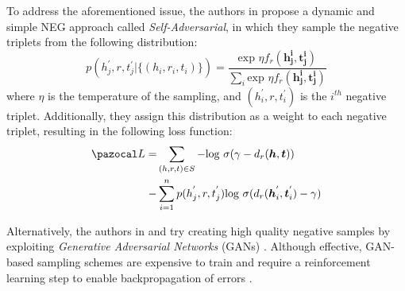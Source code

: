 To address the aforementioned issue, the authors in \cite{sun2019rotate} propose a dynamic and simple NEG approach called \emph{Self-Adversarial}, in which they sample the negative triplets from the following distribution: 
\begin{equation}
\label{eq:dist_adv}
    p(h_j^{'},r,t_j^{'}|\{(h_i,r_i,t_i)\})=\frac{\text{exp }\eta f_r(\boldsymbol{h_j^{i}},\boldsymbol{t_j^{i}})}{\sum_{i}\text{exp }\eta f_r(\boldsymbol{h_j^{i}},\boldsymbol{t_j^{i}})}
\end{equation}
where $\eta$ is the temperature of the sampling, and $(h_i^{'},r,t_i^{'})$ is the $i^{th}$ negative triplet. Additionally, they assign this distribution as a weight to each negative triplet, resulting in the following loss function: 
\begin{align}
    \Lb = &\sum_{(h,r,t) \in S} -\text{log }\sigma(\gamma - d_r(\boldsymbol{h},\boldsymbol{t}))  \notag \\ 
    - &\sum_{i=1}^{n}p(h_j^{'},r,t_j^{'})\text{log }\sigma(d_r(\boldsymbol{h}_i^{'},\boldsymbol{t}_i^{'})-\gamma)
\end{align}


Alternatively, the authors in \cite{wang2018incorporating} and \cite{cai2017kbgan} try creating high quality negative samples by exploiting \emph{Generative Adversarial Networks} (GANs) \cite{goodfellow2014generative}. Although effective, GAN-based sampling schemes are expensive to train
and require a reinforcement learning step to enable backpropagation of errors \cite{zhang2019nscaching, cai2017kbgan}. 





